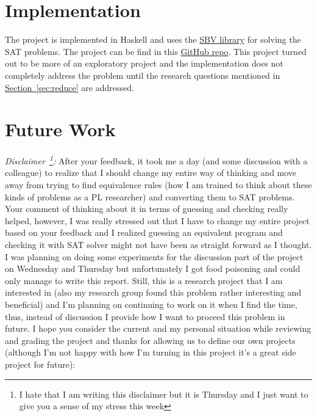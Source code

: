 \documentclass[12pt]{article}
\newcommand{\secref}[1]{\hyperref[sec:#1]{Section~\ref*{sec:#1}}}
\begin{document}
\section{Implementation}
\label{sec:impl}

The project is implemented in Haskell and uses the \href{https://hackage.haskell.org/package/sbv-8.5}{SBV library} for
solving the SAT problems. The project can be find in this \href{https://github.com/pataei/cs517/tree/master/code/cs517prj}{GitHub repo}. 
This project turned out to be more of an exploratory project and the implementation does not completely address the problem until the research questions mentioned in \secref{reduce} are addressed. 


\section{Future Work}
\label{sec:disc}

\emph{Disclaimer~\footnote{I hate that I am writing this disclaimer but it is Thursday and I just want to give you a sense of my stress this week}:} 
After your feedback, it took me a day (and some discussion with a colleague)  
to realize that I should change
my entire way of thinking and move away from trying to find equivalence rules
(how I am trained to think about these kinds of problems as a PL researcher)
and converting them to SAT problems. Your comment of thinking about it
in terms of guessing and checking really helped, however, I was really
stressed out that I have to change my entire project based on your feedback
and I realized guessing an equivalent program and checking it with SAT
solver might not have been as straight forward as I thought. I was planning
on doing some experiments for the discussion part of the project 
on Wednesday and Thursday but unfortunately I
got food poisoning and could only manage to write this report. 
Still, this is a research project that I am interested in (also my research 
group found this problem rather interesting and beneficial) and I'm planning
on continuing to work on it when I find the time, thus, instead of discussion
I provide how I want to proceed this problem in future. I hope
you consider the current and my personal situation while reviewing and grading 
the project and thanks for allowing us to define our own projects (although I'm not
happy with how I'm turning in this project it's a great side project for future):
\end{document}
